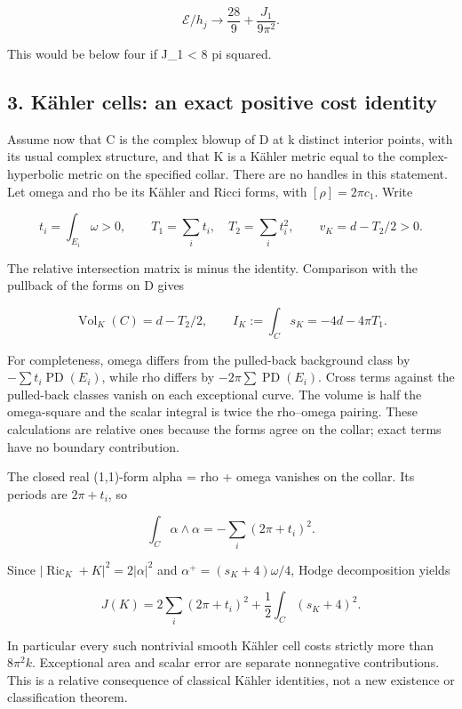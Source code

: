 \documentclass[
  10pt,
]{article}
\begin{document}
\[
 \mathcal E/h_j\to\frac{28}{9}+\frac{J_1}{9\pi^2}.
\]

This would be below four if J\_1 \textless{} 8 pi squared.

\hypertarget{kuxe4hler-cells-an-exact-positive-cost-identity}{%
\subsection{3. Kähler cells: an exact positive cost
identity}\label{kuxe4hler-cells-an-exact-positive-cost-identity}}

Assume now that C is the complex blowup of D at k distinct interior
points, with its usual complex structure, and that K is a Kähler metric
equal to the complex-hyperbolic metric on the specified collar. There
are no handles in this statement. Let omega and rho be its Kähler and
Ricci forms, with \([\rho]=2\pi c_1\). Write

\[
 t_i=\int_{E_i}\omega>0,\qquad T_1=\sum_i t_i,\quad T_2=\sum_i t_i^2,
 \qquad v_K=d-T_2/2>0.
\]

The relative intersection matrix is minus the identity. Comparison with
the pullback of the forms on D gives

\[
 \operatorname{Vol}_K(C)=d-T_2/2,\qquad
 I_K:=\int_Cs_K=-4d-4\pi T_1.                             \tag{3.1}
\]

For completeness, omega differs from the pulled-back background class by
\(-\sum t_i\operatorname{PD}(E_i)\), while rho differs by
\(-2\pi\sum\operatorname{PD}(E_i)\). Cross terms against the pulled-back
classes vanish on each exceptional curve. The volume is half the
omega-square and the scalar integral is twice the rho--omega pairing.
These calculations are relative ones because the forms agree on the
collar; exact terms have no boundary contribution.

The closed real (1,1)-form alpha = rho + omega vanishes on the collar.
Its periods are \(2\pi+t_i\), so

\[
 \int_C\alpha\wedge\alpha=-\sum_i(2\pi+t_i)^2.
\]

Since \(|\operatorname{Ric}_K+K|^2=2|\alpha|^2\) and
\(\alpha^+=(s_K+4)\omega/4\), Hodge decomposition yields

\[
 \boxed{J(K)=2\sum_i(2\pi+t_i)^2
                    +\frac12\int_C(s_K+4)^2.}             \tag{3.2}
\]

In particular every such nontrivial smooth Kähler cell costs strictly
more than \(8\pi^2k\). Exceptional area and scalar error are separate
nonnegative contributions. This is a relative consequence of classical
Kähler identities, not a new existence or classification theorem.
\end{document}
